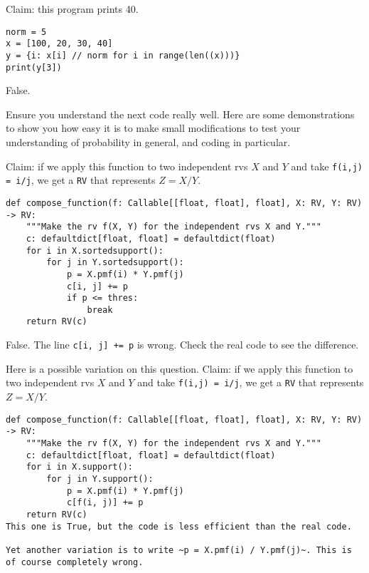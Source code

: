 \documentclass[stochastic-or]{subfiles}
\begin{document}
\begin{truefalse}
Claim: this program prints 40.
\begin{verbatim}
norm = 5
x = [100, 20, 30, 40]
y = {i: x[i] // norm for i in range(len((x)))}
print(y[3])
\end{verbatim}
\begin{solution}
False.
\end{solution}
\end{truefalse}

Ensure you understand the next code really well.
Here are some demonstrations to show you how easy it is to make small modifications to test your understanding of probability in general, and coding in particular.

\begin{truefalse}
Claim: if we apply this function to two independent rvs \(X\) and \(Y\) and take \texttt{f(i,j) = i/j}, we get a \texttt{RV} that represents \(Z=X/Y\).
\begin{verbatim}
def compose_function(f: Callable[[float, float], float], X: RV, Y: RV) -> RV:
    """Make the rv f(X, Y) for the independent rvs X and Y."""
    c: defaultdict[float, float] = defaultdict(float)
    for i in X.sortedsupport():
        for j in Y.sortedsupport():
            p = X.pmf(i) * Y.pmf(j)
            c[i, j] += p
            if p <= thres:
                break
    return RV(c)
\end{verbatim}
\begin{solution}
False. The line \texttt{c[i, j] += p} is wrong. Check the real code to see the difference.

Here is a possible variation on this question.
Claim: if we apply this function to two independent rvs \(X\) and \(Y\) and take \texttt{f(i,j) = i/j}, we get a \texttt{RV} that represents \(Z=X/Y\).
\begin{verbatim}
def compose_function(f: Callable[[float, float], float], X: RV, Y: RV) -> RV:
    """Make the rv f(X, Y) for the independent rvs X and Y."""
    c: defaultdict[float, float] = defaultdict(float)
    for i in X.support():
        for j in Y.support():
            p = X.pmf(i) * Y.pmf(j)
            c[f(i, j)] += p
    return RV(c)
This one is True, but the code is less efficient than the real code.

Yet another variation is to write ~p = X.pmf(i) / Y.pmf(j)~. This is of course completely wrong.
\end{verbatim}
\end{solution}
\end{truefalse}
\end{document}
